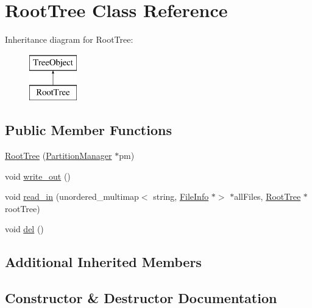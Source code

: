 \hypertarget{classRootTree}{}\section{Root\+Tree Class Reference}
\label{classRootTree}
Inheritance diagram for Root\+Tree\+:\begin{figure}[H]
\begin{center}
\leavevmode
\includegraphics[height=2.000000cm]{classRootTree}
\end{center}
\end{figure}
\subsection*{Public Member Functions}
\begin{DoxyCompactItemize}
\item 
\mbox{\hyperlink{classRootTree_a491c0374c9024faf1e1c8045f21a4cad}{Root\+Tree}} (\mbox{\hyperlink{classPartitionManager}{Partition\+Manager}} $\ast$pm)
\item 
void \mbox{\hyperlink{classRootTree_ad6eefe5d46ee37b3725799897a78c2dd}{write\+\_\+out}} ()
\item 
void \mbox{\hyperlink{classRootTree_a658eed78be67e890de2283af960dc532}{read\+\_\+in}} (unordered\+\_\+multimap$<$ string, \mbox{\hyperlink{classFileInfo}{File\+Info}} $\ast$$>$ $\ast$all\+Files, \mbox{\hyperlink{classRootTree}{Root\+Tree}} $\ast$root\+Tree)
\item 
void \mbox{\hyperlink{classRootTree_ac431dc04b767fc66791c251d8173650d}{del}} ()
\end{DoxyCompactItemize}
\subsection*{Additional Inherited Members}


\subsection{Constructor \& Destructor Documentation}
\mbox{\label{classRootTree_a491c0374c9024faf1e1c8045f21a4cad}} 
